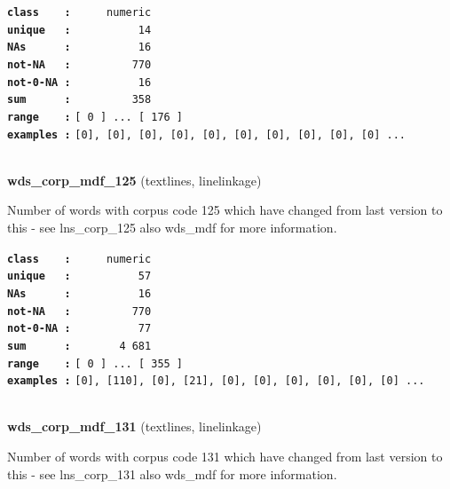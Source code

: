 \documentclass[]{article}
\begin{document}
\textbf{\texttt{class\ \ \ \ :}} \texttt{~~~~~numeric}\\
\textbf{\texttt{unique\ \ \ :}} \texttt{~~~~~~~~~~14}\\
\textbf{\texttt{NAs\ \ \ \ \ \ :}} \texttt{~~~~~~~~~~16}\\
\textbf{\texttt{not-NA\ \ \ :}} \texttt{~~~~~~~~~770}\\
\textbf{\texttt{not-0-NA\ :}} \texttt{~~~~~~~~~~16}\\
\textbf{\texttt{sum\ \ \ \ \ \ :}} \texttt{~~~~~~~~~358}\\
\textbf{\texttt{range\ \ \ \ :}}
\texttt{{[}\ 0\ {]}\ ...\ {[}\ 176\ {]}}\\
\textbf{\texttt{examples\ :}}
\texttt{{[}0{]},\ {[}0{]},\ {[}0{]},\ {[}0{]},\ {[}0{]},\ {[}0{]},\ {[}0{]},\ {[}0{]},\ {[}0{]},\ {[}0{]}\ ...}\\

~

\textbf{wds\_corp\_mdf\_125} (textlines, linelinkage)

Number of words with corpus code 125 which have changed from last
version to this - see lns\_corp\_125 also wds\_mdf for more information.

\textbf{\texttt{class\ \ \ \ :}} \texttt{~~~~~numeric}\\
\textbf{\texttt{unique\ \ \ :}} \texttt{~~~~~~~~~~57}\\
\textbf{\texttt{NAs\ \ \ \ \ \ :}} \texttt{~~~~~~~~~~16}\\
\textbf{\texttt{not-NA\ \ \ :}} \texttt{~~~~~~~~~770}\\
\textbf{\texttt{not-0-NA\ :}} \texttt{~~~~~~~~~~77}\\
\textbf{\texttt{sum\ \ \ \ \ \ :}} \texttt{~~~~~~~4~681}\\
\textbf{\texttt{range\ \ \ \ :}}
\texttt{{[}\ 0\ {]}\ ...\ {[}\ 355\ {]}}\\
\textbf{\texttt{examples\ :}}
\texttt{{[}0{]},\ {[}110{]},\ {[}0{]},\ {[}21{]},\ {[}0{]},\ {[}0{]},\ {[}0{]},\ {[}0{]},\ {[}0{]},\ {[}0{]}\ ...}\\

~

\textbf{wds\_corp\_mdf\_131} (textlines, linelinkage)

Number of words with corpus code 131 which have changed from last
version to this - see lns\_corp\_131 also wds\_mdf for more information.
\end{document}

